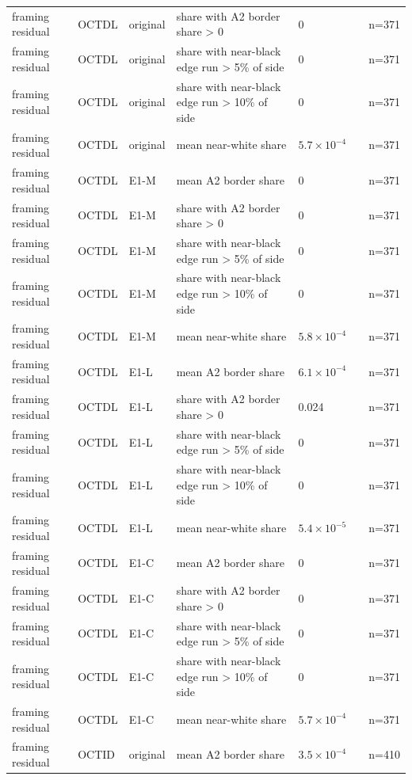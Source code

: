 \begin{longtable}{@{}p{3.3cm}lp{1.5cm}p{3.6cm}p{2.2cm}p{1.6cm}p{3.2cm}@{}}
framing residual & OCTDL & original & share with A2 border share > 0 & 0 &  & n=371 \\
framing residual & OCTDL & original & share with near-black edge run > 5\% of side & 0 &  & n=371 \\
framing residual & OCTDL & original & share with near-black edge run > 10\% of side & 0 &  & n=371 \\
framing residual & OCTDL & original & mean near-white share & $5.7\times10^{-4}$ &  & n=371 \\
framing residual & OCTDL & E1-M & mean A2 border share & 0 &  & n=371 \\
framing residual & OCTDL & E1-M & share with A2 border share > 0 & 0 &  & n=371 \\
framing residual & OCTDL & E1-M & share with near-black edge run > 5\% of side & 0 &  & n=371 \\
framing residual & OCTDL & E1-M & share with near-black edge run > 10\% of side & 0 &  & n=371 \\
framing residual & OCTDL & E1-M & mean near-white share & $5.8\times10^{-4}$ &  & n=371 \\
framing residual & OCTDL & E1-L & mean A2 border share & $6.1\times10^{-4}$ &  & n=371 \\
framing residual & OCTDL & E1-L & share with A2 border share > 0 & 0.024 &  & n=371 \\
framing residual & OCTDL & E1-L & share with near-black edge run > 5\% of side & 0 &  & n=371 \\
framing residual & OCTDL & E1-L & share with near-black edge run > 10\% of side & 0 &  & n=371 \\
framing residual & OCTDL & E1-L & mean near-white share & $5.4\times10^{-5}$ &  & n=371 \\
framing residual & OCTDL & E1-C & mean A2 border share & 0 &  & n=371 \\
framing residual & OCTDL & E1-C & share with A2 border share > 0 & 0 &  & n=371 \\
framing residual & OCTDL & E1-C & share with near-black edge run > 5\% of side & 0 &  & n=371 \\
framing residual & OCTDL & E1-C & share with near-black edge run > 10\% of side & 0 &  & n=371 \\
framing residual & OCTDL & E1-C & mean near-white share & $5.7\times10^{-4}$ &  & n=371 \\
framing residual & OCTID & original & mean A2 border share & $3.5\times10^{-4}$ &  & n=410 \\

\end{longtable}
